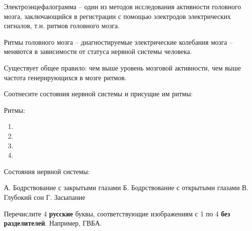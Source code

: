 
Электроэнцефалограмма – один из методов исследования активности головного мозга, заключающийся в регистрации с помощью электродов электрических сигналов, т.н. ритмов головного мозга.

Ритмы головного мозга – диагностируемые электрические колебания мозга – меняются в зависимости от статуса нервной системы человека.

Существует общее правило: чем выше уровень мозговой активности, чем выше частота генерирующихся в мозге ритмов.

Соотнесите состояния нервной системы и присущие им ритмы:

Ритмы:

\begin{enumerate}
    \item 
    \item 
    \item 
    \item 
\end{enumerate}

Состояния нервной системы:

А. Бодрствование с закрытыми глазами
Б. Бодрствование с открытыми глазами
В. Глубокий сон
Г. Засыпание

Перечислите 4 \textbf{русские} буквы, соответствующие изображениям с 1 по 4 \textbf{без разделителей}. Например, ГВБА.

